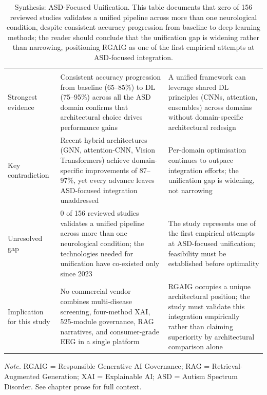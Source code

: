 {\tablestripes\tablefontsize
\begin{xltabular}{\textwidth}{@{} l L L @{}}
\caption[Synthesis: ASD-Focused Unification]{Synthesis: ASD-Focused Unification. This table documents that zero of 156 reviewed studies validates a unified pipeline across more than one neurological condition, despite consistent accuracy progression from baseline to deep learning methods; the reader should conclude that the unification gap is widening rather than narrowing, positioning RGAIG as one of the first empirical attempts at ASD-focused integration.}\label{tab:synth_cross_domain} \\
\toprule
{} &  &  \\
\midrule
\endfirsthead
\toprule
{} &  &  \\
\midrule
\endhead
\bottomrule
\endlastfoot
Strongest evidence & Consistent accuracy progression from baseline (65--85\%) to DL (75--95\%) across all the ASD domain confirms that architectural choice drives performance gains & A unified framework can leverage shared DL principles (CNNs, attention, ensembles) across domains without domain-specific architectural redesign \\
\addlinespace
Key contradiction & Recent hybrid architectures (GNN, attention-CNN, Vision Transformers) achieve domain-specific improvements of 87--97\%, yet every advance leaves ASD-focused integration unaddressed & Per-domain optimisation continues to outpace integration efforts; the unification gap is widening, not narrowing \\
\addlinespace
Unresolved gap & 0 of 156 reviewed studies validates a unified pipeline across more than one neurological condition; the technologies needed for unification have co-existed only since 2023 & The study represents one of the first empirical attempts at ASD-focused unification; feasibility must be established before optimality \\
\addlinespace
Implication for this study & No commercial vendor combines multi-disease screening, four-method XAI, 525-module governance, RAG narratives, and consumer-grade EEG in a single platform & RGAIG occupies a unique architectural position; the study must validate this integration empirically rather than claiming superiority by architectural comparison alone \\
\end{xltabular}}
\vspace{0.3em}\noindent\textit{Note.} RGAIG = Responsible Generative AI Governance; RAG = Retrieval-Augmented Generation; XAI = Explainable AI; ASD = Autism Spectrum Disorder. See chapter prose for full context.

